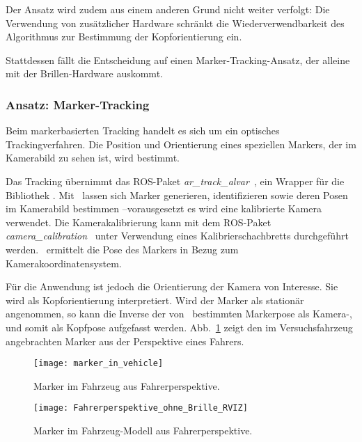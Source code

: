 Der Ansatz wird zudem aus einem anderen Grund nicht weiter verfolgt:
Die Verwendung von zusätzlicher Hardware schränkt die Wiederverwendbarkeit des Algorithmus zur Bestimmung der Kopforientierung ein.

Stattdessen fällt die Entscheidung auf einen Marker-Tracking-Ansatz, der alleine mit der Brillen-Hardware auskommt.


\subsubsection{Ansatz: Marker-Tracking}
\label{headtracking_markertracking_subsubsec}

Beim markerbasierten Tracking handelt es sich um ein optisches Trackingverfahren.
Die Position und Orientierung eines speziellen Markers, der im Kamerabild zu sehen ist, wird bestimmt.

Das Tracking übernimmt das \ac{ROS}-Paket \emph{ar\_track\_alvar}~\cite{ros_ar_track_alvar}, ein Wrapper für die Bibliothek \alvar.
Mit \alvar \ lassen sich Marker generieren, identifizieren sowie deren Posen im Kamerabild bestimmen --vorausgesetzt es wird eine kalibrierte Kamera verwendet.
Die Kamerakalibrierung kann mit dem \ac{ROS}-Paket \emph{camera\_calibration}~\cite{ros_camera_calibration} unter Verwendung eines Kalibrierschachbretts durchgeführt werden.
\alvar \ ermittelt die Pose des Markers in Bezug zum Kamerakoordinatensystem.

Für die Anwendung ist jedoch die Orientierung der Kamera von Interesse.
Sie wird als Kopforientierung interpretiert.
Wird der Marker als stationär angenommen, so kann die Inverse der von \alvar \ bestimmten Markerpose als Kamera-, und somit als Kopfpose aufgefasst werden.
Abb.~\ref{fig:marker_in_vehicle_driver_view} zeigt den im Versuchsfahrzeug angebrachten Marker aus der Perspektive eines Fahrers.

\begin{figure}
  \centering
  \texttt{[image: marker\_in\_vehicle]}
  \caption{Marker im Fahrzeug aus Fahrerperspektive.}
  \label{fig:marker_in_vehicle_driver_view}
\end{figure}

\begin{figure}
  \centering
  \texttt{[image: Fahrerperspektive\_ohne\_Brille\_RVIZ]}
  \caption{Marker im Fahrzeug-Modell aus Fahrerperspektive.}
  \label{fig:marker_in_vehicle_model_driver_view}
\end{figure}

